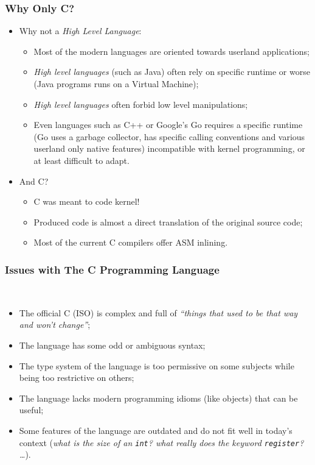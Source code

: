\documentclass[pdftex]{beamer}
\begin{document}
\begin{frame}
  \frametitle{Why Only C?}
  \begin{itemize}
  \item Why not a \emph{High Level Language}:
    \begin{itemize}
    \item Most of the modern languages are oriented towards userland
      applications;
    \item \emph{High level languages} (such as Java) often rely on
      specific runtime or worse (Java programs runs on a Virtual
      Machine);
    \item \emph{High level languages} often forbid low level
      manipulations;
    \item Even languages such as C++ or Google's Go requires a
      specific runtime (Go uses a garbage collector, has specific
      calling conventions and various userland only native features)
      incompatible with kernel programming, or at least difficult to
      adapt.
    \end{itemize}
  \item And C?
    \begin{itemize}
    \item C was meant to code kernel!
    \item Produced code is almost a direct translation of the original
      source code;
    \item Most of the current C compilers offer ASM inlining.
    \end{itemize}
  \end{itemize}
\end{frame}

\begin{frame}
  \frametitle{Issues with The C Programming Language}

  \ \\

  \begin{itemize}
  \item The official C (ISO) is complex and full of \emph{``things
      that used to be that way and won't change''};
  \item The language has some odd or ambiguous syntax;
  \item The type system of the language is too permissive on some
    subjects while being too restrictive on others;
  \item The language lacks modern programming idioms (like
    objects) that can be useful;
  \item Some features of the language are outdated and do not fit
    well in today's context (\emph{what is the size of an \texttt{int}?
    what really does the keyword \texttt{register}? \ldots}).
  \end{itemize}
\end{frame}
\end{document}

